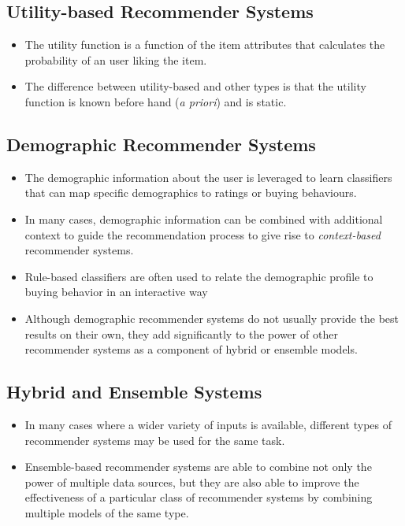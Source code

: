 \documentclass{article}
\begin{document}
\subsection{Utility-based Recommender Systems}
\begin{itemize}
    \item The utility function is a function of the item attributes that calculates the probability of an user liking the item. 
    
    \item The difference between utility-based and other types is that the utility function is known before hand (\textit{a priori}) and is static.
\end{itemize}

\subsection{Demographic Recommender Systems}
\begin{itemize}
    \item The demographic information about the user is leveraged to learn classifiers that can map specific demographics to ratings or buying behaviours.
    
    \item In many cases, demographic information can be combined with additional context to guide the recommendation process to give rise to \textit{context-based} recommender systems.
    
    \item Rule-based classifiers are often used to relate the demographic profile to buying behavior in an interactive way
    
    \item Although demographic recommender systems do not usually provide the best results on their own, they add significantly to the power of other recommender systems as a component of hybrid or ensemble models.
\end{itemize}

\subsection{Hybrid and Ensemble Systems}
\begin{itemize}
    \item In many cases where a wider variety of inputs is available, different types of recommender systems may be used for the same task.
    
    \item Ensemble-based recommender systems are able to combine not only the power of multiple data sources, but they are also able to improve the effectiveness of a particular class of recommender systems by combining multiple models of the same type.
\end{itemize}
\end{document}
